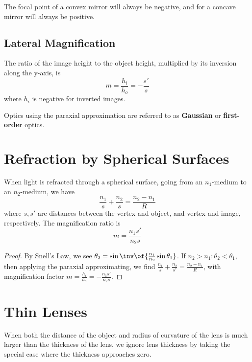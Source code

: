 \begin{note}
    The focal point of a convex mirror will always be negative, and for a concave mirror will always be positive.
\end{note}

\subsection{Lateral Magnification}

\begin{definition}
    The ratio of the image height to the object height, multiplied by its inversion along the y-axis, is $$m = \frac{h_i}{h_o} = -\frac{s'}{s}$$ where $h_i$ is negative for inverted images.
\end{definition}

\begin{remark}
    Optics using the paraxial approximation are referred to as \textbf{Gaussian} or \textbf{first-order} optics.
\end{remark}

\section{Refraction by Spherical Surfaces}


\begin{theorem}
    When light is refracted through a spherical surface, going from an $n_1$-medium to an $n_2$-medium, we have $$\frac{n_1}{s} + \frac{n_2}{s} = \frac{n_2 - n_1}{R}$$ where $s, s'$ are distances between the vertex and object, and vertex and image, respectively. The magnification ratio is $$m = \frac{n_1s'}{n_2s}$$
\end{theorem}
\begin{proof}
    By Snell's Law, we see $\theta_2 = \sin\inv\of{\frac{n_1}{n_2}\sin\theta_1}$.
    If $n_2 > n_1: \theta_2 < \theta_1$, then applying the paraxial approximating, we find $\frac{n_1}{s} + \frac{n_2}{s'} = \frac{n_2 - n_1}{R}$, with magnification factor $m = \frac{h_i}{h_o} = -\frac{n_1s'}{n_2s}$.
\end{proof}

\section{Thin Lenses}

When both the distance of the object and radius of curvature of the lens is much larger than the thickness of the lens, we ignore lens thickness by taking the special case where the thickness approaches zero.